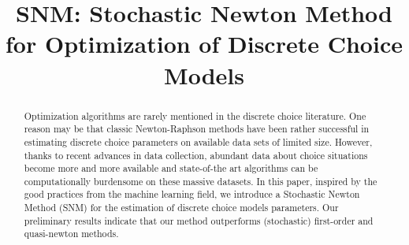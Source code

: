 \documentclass[conference]{IEEEtran}
\begin{document}
\title{SNM: Stochastic Newton Method for Optimization of Discrete Choice Models}

\author{

\and
{}
\and
{}
}

\maketitle

\begin{abstract}
Optimization algorithms are rarely mentioned in the discrete choice literature. One reason may be that classic Newton-Raphson methods have been rather successful in estimating discrete choice parameters on available data sets of limited size. However, thanks to recent advances in data collection, abundant data about choice situations become more and more available and state-of-the art algorithms can be computationally burdensome on these massive datasets.  In this paper, inspired by the good practices from the machine learning field, we introduce a Stochastic Newton Method (SNM) for the estimation of discrete choice models parameters. Our preliminary results indicate that our method outperforms (stochastic) first-order and quasi-newton methods. 

\end{abstract}
\end{document}
